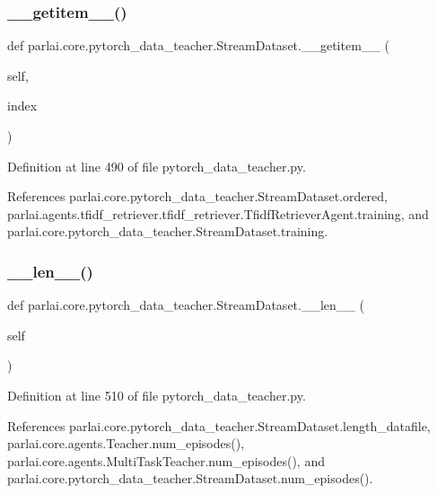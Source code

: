 \subsubsection{\texorpdfstring{\+\_\+\+\_\+getitem\+\_\+\+\_\+()}{\_\_getitem\_\_()}}
{\footnotesize\ttfamily def parlai.\+core.\+pytorch\+\_\+data\+\_\+teacher.\+Stream\+Dataset.\+\_\+\+\_\+getitem\+\_\+\+\_\+ (\begin{DoxyParamCaption}\item[{}]{self,  }\item[{}]{index }\end{DoxyParamCaption})}



Definition at line 490 of file pytorch\+\_\+data\+\_\+teacher.\+py.



References parlai.\+core.\+pytorch\+\_\+data\+\_\+teacher.\+Stream\+Dataset.\+ordered, parlai.\+agents.\+tfidf\+\_\+retriever.\+tfidf\+\_\+retriever.\+Tfidf\+Retriever\+Agent.\+training, and parlai.\+core.\+pytorch\+\_\+data\+\_\+teacher.\+Stream\+Dataset.\+training.

\mbox{\label{classparlai_1_1core_1_1pytorch__data__teacher_1_1StreamDataset_abbd35926c8f0dd0dd153d5f838be163c}} 
\subsubsection{\texorpdfstring{\+\_\+\+\_\+len\+\_\+\+\_\+()}{\_\_len\_\_()}}
{\footnotesize\ttfamily def parlai.\+core.\+pytorch\+\_\+data\+\_\+teacher.\+Stream\+Dataset.\+\_\+\+\_\+len\+\_\+\+\_\+ (\begin{DoxyParamCaption}\item[{}]{self }\end{DoxyParamCaption})}



Definition at line 510 of file pytorch\+\_\+data\+\_\+teacher.\+py.



References parlai.\+core.\+pytorch\+\_\+data\+\_\+teacher.\+Stream\+Dataset.\+length\+\_\+datafile, parlai.\+core.\+agents.\+Teacher.\+num\+\_\+episodes(), parlai.\+core.\+agents.\+Multi\+Task\+Teacher.\+num\+\_\+episodes(), and parlai.\+core.\+pytorch\+\_\+data\+\_\+teacher.\+Stream\+Dataset.\+num\+\_\+episodes().

